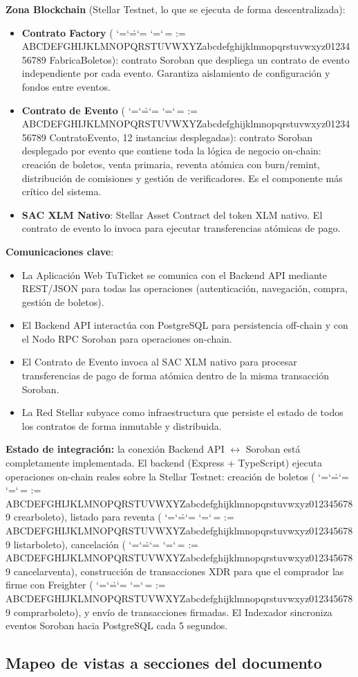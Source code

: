 \documentclass[12pt,oneside]{article}
\makeatletter
\def\ttbreak@uscore{\char95\penalty0\hskip0pt\relax}%
\def\ttbreak@actcat#1{\catcode`#1=\active}%
\def\ttbreak@chars{%
  \catcode`\/=\active \catcode`\.=\active \catcode`\:=\active
  \catcode`\-=\active \catcode`\,=\active
  \@tfor\ttbreak@c:=%
ABCDEFGHIJKLMNOPQRSTUVWXYZabcdefghijklmnopqrstuvwxyz0123456789\do{%
    \expandafter\ttbreak@actcat\ttbreak@c}%
  \let\_\ttbreak@uscore}%
\DeclareRobustCommand{\texttt}{\begingroup\ttfamily\ttbreak@chars\ttbreak@grab}
\def\ttbreak@grab#1{#1\endgroup}
\makeatother
\begin{document}
\textbf{Zona Blockchain} (Stellar Testnet, lo que se ejecuta de forma descentralizada):
\begin{itemize}
  \item \textbf{Contrato Factory} (\texttt{FabricaBoletos}): contrato Soroban que despliega un contrato de evento independiente por cada evento. Garantiza aislamiento de configuración y fondos entre eventos.
  \item \textbf{Contrato de Evento} (\texttt{ContratoEvento}, 12 instancias desplegadas): contrato Soroban desplegado por evento que contiene toda la lógica de negocio on-chain: creación de boletos, venta primaria, reventa atómica con burn/remint, distribución de comisiones y gestión de verificadores. Es el componente más crítico del sistema.
  \item \textbf{SAC XLM Nativo}: Stellar Asset Contract del token XLM nativo. El contrato de evento lo invoca para ejecutar transferencias atómicas de pago.
\end{itemize}

\textbf{Comunicaciones clave}:
\begin{itemize}
  \item La Aplicación Web TuTicket se comunica con el Backend API mediante REST/JSON para todas las operaciones (autenticación, navegación, compra, gestión de boletos).
  \item El Backend API interactúa con PostgreSQL para persistencia off-chain y con el Nodo RPC Soroban para operaciones on-chain.
  \item El Contrato de Evento invoca al SAC XLM nativo para procesar transferencias de pago de forma atómica dentro de la misma transacción Soroban.
  \item La Red Stellar subyace como infraestructura que persiste el estado de todos los contratos de forma inmutable y distribuida.
\end{itemize}

\textbf{Estado de integración:} la conexión Backend API $\leftrightarrow$ Soroban está completamente implementada. El backend (Express + TypeScript) ejecuta operaciones on-chain reales sobre la Stellar Testnet: creación de boletos (\texttt{crear\_boleto}), listado para reventa (\texttt{listar\_boleto}), cancelación (\texttt{cancelar\_venta}), construcción de transacciones XDR para que el comprador las firme con Freighter (\texttt{comprar\_boleto}), y envío de transacciones firmadas. El Indexador sincroniza eventos Soroban hacia PostgreSQL cada 5 segundos.

\subsection{Mapeo de vistas a secciones del documento}
\end{document}
